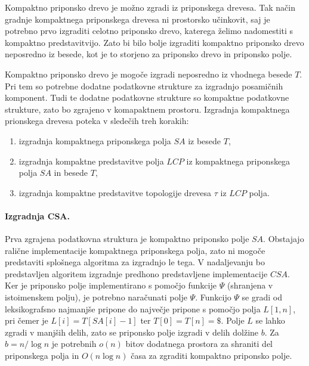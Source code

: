Kompaktno priponsko drevo je možno zgradi iz priponskega drevesa. Tak način gradnje kompaktnega priponskega drevesa ni prostorsko učinkovit, saj je potrebno prvo izgraditi celotno priponsko drevo, katerega želimo nadomestiti s kompaktno predstavitvijo. Zato bi bilo bolje izgraditi kompaktno priponsko drevo neposredno iz besede, kot je to storjeno za priponsko drevo in priponsko polje.

Kompaktno priponsko drevo je mogoče izgradi neposredno iz vhodnega besede $T$. Pri tem so potrebne dodatne podatkovne strukture za izgradnjo posamičnih komponent. Tudi te dodatne podatkovne strukture so kompaktne podatkovne strukture, zato bo  zgrajeno v komapaktnem prostoru. Izgradnja kompaktnega prionskega drevesa poteka v sledečih treh korakih:
\begin{enumerate}
    \item izgradnja kompaktnega priponskega polja $SA$ iz besede $T$,
    \item izgradnja kompaktne predstavitve polja $LCP$ iz kompaktnega priponskega polja $SA$ in besede $T$,
    \item izgradnja kompaktne predstavitve topologije drevesa $\tau$ iz $LCP$ polja.
\end{enumerate}

\paragraph{Izgradnja CSA.}

Prva zgrajena podatkovna struktura je kompaktno priponsko polje $SA$. Obstajajo ralične implementacije kompaktnega priponskega polja, zato ni mogoče predstaviti splošnega algoritma za izgradnjo le tega. V nadaljevanju bo predstavljen algoritem izgradnje predhono predstavljene implementacije $CSA$. Ker je priponsko polje implementirano s pomočjo funkcije $\Psi$ (shranjena v istoimenskem polju), je potrebno naračunati polje $\Psi$. 
Funkcijo $\Psi$ se gradi od leksikografsno najmanjše pripone do največje pripone s pomočjo polja $L[1,n]$, pri čemer je $L[i]=T[SA[i]-1]$ ter $T[0]=T[n]=\$$.
Polje $L$ se lahko zgradi v manjših delih, zato se priponsko polje izgradi v delih dolžine $b$. Za $b=n/\log{n}$ je potrebnih $o(n)$ bitov dodatnega prostora za shraniti del priponskega polja in $O(n\log{n})$ časa za zgraditi kompaktno priponsko polje\cite{Navarro2016}.

